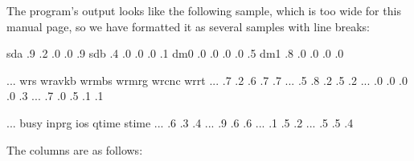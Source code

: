 \documentclass[letterpaper,10pt,english]{sphinxmanual}
\begin{document}
\sphinxAtStartPar
The program’s output looks like the following sample, which is too wide for this
manual page, so we have formatted it as several samples with line breaks:

\begin{sphinxVerbatim}[commandchars=\\\{\}]
 sda     .9     .2     .0     \PYGZpc{}    .0    .9
 sdb     .4     .0     .0     \PYGZpc{}    .0    .1
 dm\PYGZhy{}0    .0     .0     .0     \PYGZpc{}    .0    .5
 dm\PYGZhy{}1    .8     .0     .0     \PYGZpc{}    .0    .0

    ...    wr\PYGZus{}s wr\PYGZus{}avkb wr\PYGZus{}mb\PYGZus{}s wr\PYGZus{}mrg wr\PYGZus{}cnc   wr\PYGZus{}rt
    ...    .7     .2     .6    \PYGZpc{}    .7    .7
    ...    .5    .8     .2    \PYGZpc{}    .5     .2
    ...     .0     .0     .0     \PYGZpc{}    .0     .3
    ...   .7     .0     .5     \PYGZpc{}    .1    .1

    ...              busy in\PYGZus{}prg    io\PYGZus{}s  qtime stime
    ...                \PYGZpc{}         .6   .3   .4
    ...                \PYGZpc{}          .9    .6   .6
    ...                \PYGZpc{}           .1    .5   .2
    ...                \PYGZpc{}         .5   .5   .4
\end{sphinxVerbatim}

\sphinxAtStartPar
The columns are as follows:
\end{document}
